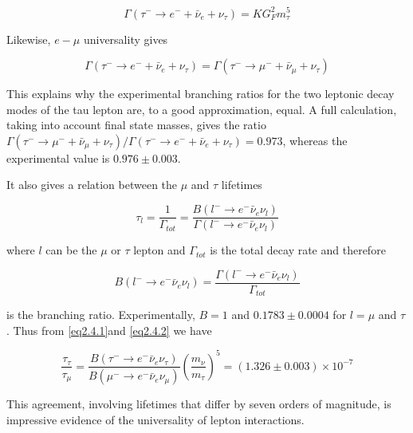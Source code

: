 	\begin{equation}
	\Gamma(\tau^{-}\rightarrow e^{-} + \bar{\nu}_{e} + \nu_{\tau}) = KG_{F}^{2}m_{\tau}^{5}
	\end{equation}

	Likewise, $e - \mu$ universality gives

	\begin{equation}
	\Gamma(\tau^{-}\rightarrow e^{-} + \bar{\nu}_{e} + \nu_{\tau}) = \Gamma(\tau^{-}\rightarrow \mu^{-} + \bar{\nu}_{\mu} + \nu_{\tau})
	\end{equation}

	This explains why the experimental branching ratios for the two leptonic decay modes of the tau lepton are, to a good approximation, equal. A full calculation, taking into account final state masses, gives the ratio $\Gamma(\tau^{-}\rightarrow \mu^{-} + \bar{\nu}_{\mu} + \nu_{\tau})/\Gamma(\tau^{-}\rightarrow e^{-} + \bar{\nu}_{e} + \nu_{\tau})=0.973$, whereas the experimental value is $0.976\pm0.003$.

	It also gives a relation between the $\mu$ and $\tau$ lifetimes 

	\begin{equation}
	\tau_{l}= \frac{1}{\Gamma_{tot}} = \frac{B(l^{-}\rightarrow e^{-}\bar{\nu}_{e}\nu_{l})}{\Gamma(l^{-}\rightarrow e^{-}\bar{\nu}_{e}\nu_{l})}
	\end{equation}

	where $l$ can be the $\mu$ or $\tau$ lepton and $\Gamma_{tot}$ is the total decay rate and therefore

	\begin{equation}
	B(l^{-}\rightarrow e^{-}\bar{\nu}_{e}\nu_{l}) = \frac{\Gamma(l^{-}\rightarrow e^{-}\bar{\nu}_{e}\nu_{l})}{\Gamma_{tot}}
	\end{equation}

	is the branching ratio. Experimentally, $B=1$ and $0.1783\pm0.0004$ for $l=\mu$ and $\tau$. Thus from \ref{eq2.4.1}and \ref{eq2.4.2} we have

	\begin{equation}
	\frac{\tau_{\tau}}{\tau_{\mu}} = \frac{B(\tau^{-}\rightarrow e^{-}\bar{\nu}_{e}\nu_{\tau})}{B(\mu^{-}\rightarrow e^{-}\bar{\nu}_{e}\nu_{\mu})}(\frac{m_{\nu}}{m_{\tau}})^{5} = (1.326\pm0.003)\times 10^{-7}
	\end{equation}

	This agreement, involving lifetimes that differ by seven orders of magnitude, is impressive evidence of the universality of lepton interactions.

